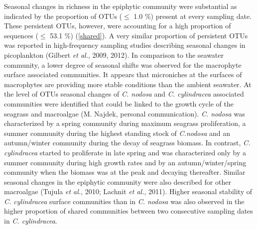 \documentclass[12pt,]{article}
\begin{document}
Seasonal changes in richness in the epiphytic community were substantial
as indicated by the proportion of OTUs (\(\leq\) 1.0 \si{\percent})
present at every sampling date. These persistent OTUs, however, were
accounting for a high proportion of sequences (\(\leq\) 53.1
\si{\percent}) (\autoref{shared}). A very similar proportion of
persistent OTUs was reported in high-frequency sampling studies
describing seasonal changes in picoplankton (Gilbert \emph{et al.},
2009, 2012). In comparison to the seawater community, a lower degree of
seasonal shifts was observed for the macrophyte surface associated
communities. It appears that microniches at the surfaces of macrophytes
are providing more stable conditions than the ambient seawater. At the
level of OTUs seasonal changes of \emph{C. nodosa} and \emph{C.
cylindracea} associated communities were identified that could be linked
to the growth cycle of the seagrass and macroalgae (M. Najdek, personal
communication). \emph{C. nodosa} was characterized by a spring community
during maximum seagrass proliferation, a summer community during the
highest standing stock of \emph{C.nodosa} and an autumn/winter community
during the decay of seagrass biomass. In contrast, \emph{C. cylindracea}
started to proliferate in late spring and was characterized only by a
summer community during high growth rates and by an autumn/winter/spring
community when the biomass was at the peak and decaying thereafter.
Similar seasonal changes in the epiphytic community were also described
for other macroalgae (Tujula \emph{et al.}, 2010; Lachnit \emph{et al.},
2011). Higher seasonal stability of \emph{C. cylindracea} surface
communities than in \emph{C. nodosa} was also observed in the higher
proportion of shared communities between two consecutive sampling dates
in \emph{C. cylindracea}.
\end{document}
